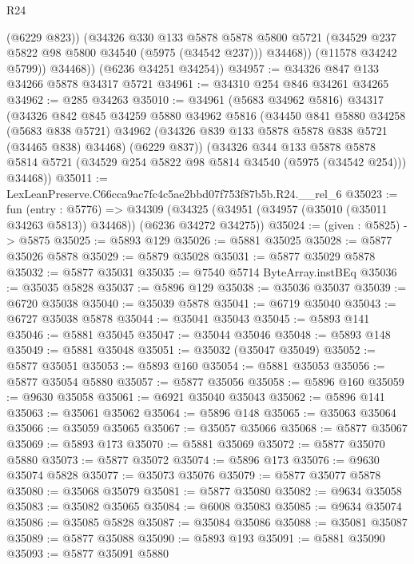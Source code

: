 \begin{lexlean}{R24}
\begin{coremodule}
                (@6229 @823))
              (@34326
                @330
                @133
                @5878
                @5878
                @5800
                @5721
                (@34529 @237 @5822 @98 @5800 @34540 (@5975 (@34542 @237)))
                @34468))
            (@11578 @34242 @5799))
          @34468))
      (@6236 @34251 @34254))
@34957 := @34326 @847 @133 @34266 @5878 @34317 @5721
@34961 := @34310 @254 @846 @34261 @34265
@34962 := @285 @34263
@35010 := @34961
    (@5683 @34962 @5816)
    @34317
    (@34326
      @842
      @845
      @34259
      @5880
      @34962
      @5816
      (@34450
        @841
        @5880
        @34258
        (@5683 @838 @5721)
        @34962
        (@34326 @839 @133 @5878 @5878 @838 @5721 (@34465 @838) @34468)
        (@6229 @837))
      (@34326
        @344
        @133
        @5878
        @5878
        @5814
        @5721
        (@34529 @254 @5822 @98 @5814 @34540 (@5975 (@34542 @254)))
        @34468))
@35011 := LexLeanPreserve.C66cca9ac7fc4c5ae2bbd07f753f87b5b.R24.__rel_6
@35023 := fun (entry : @5776) =>
  @34309 (@34325 (@34951 (@34957 (@35010 (@35011 @34263 @5813)) @34468)) (@6236 @34272 @34275))
@35024 := (given : @5825) -> @5875
@35025 := @5893 @129
@35026 := @5881 @35025
@35028 := @5877 @35026 @5878
@35029 := @5879 @35028
@35031 := @5877 @35029 @5878
@35032 := @5877 @35031
@35035 := @7540 @5714 ByteArray.instBEq
@35036 := @35035 @5828
@35037 := @5896 @129
@35038 := @35036 @35037
@35039 := @6720 @35038
@35040 := @35039 @5878
@35041 := @6719 @35040
@35043 := @6727 @35038 @5878
@35044 := @35041 @35043
@35045 := @5893 @141
@35046 := @5881 @35045
@35047 := @35044 @35046
@35048 := @5893 @148
@35049 := @5881 @35048
@35051 := @35032 (@35047 @35049)
@35052 := @5877 @35051
@35053 := @5893 @160
@35054 := @5881 @35053
@35056 := @5877 @35054 @5880
@35057 := @5877 @35056
@35058 := @5896 @160
@35059 := @9630 @35058
@35061 := @6921 @35040 @35043
@35062 := @5896 @141
@35063 := @35061 @35062
@35064 := @5896 @148
@35065 := @35063 @35064
@35066 := @35059 @35065
@35067 := @35057 @35066
@35068 := @5877 @35067
@35069 := @5893 @173
@35070 := @5881 @35069
@35072 := @5877 @35070 @5880
@35073 := @5877 @35072
@35074 := @5896 @173
@35076 := @9630 @35074 @5828
@35077 := @35073 @35076
@35079 := @5877 @35077 @5878
@35080 := @35068 @35079
@35081 := @5877 @35080
@35082 := @9634 @35058
@35083 := @35082 @35065
@35084 := @6008 @35083
@35085 := @9634 @35074
@35086 := @35085 @5828
@35087 := @35084 @35086
@35088 := @35081 @35087
@35089 := @5877 @35088
@35090 := @5893 @193
@35091 := @5881 @35090
@35093 := @5877 @35091 @5880

\end{coremodule}
\end{lexlean}
